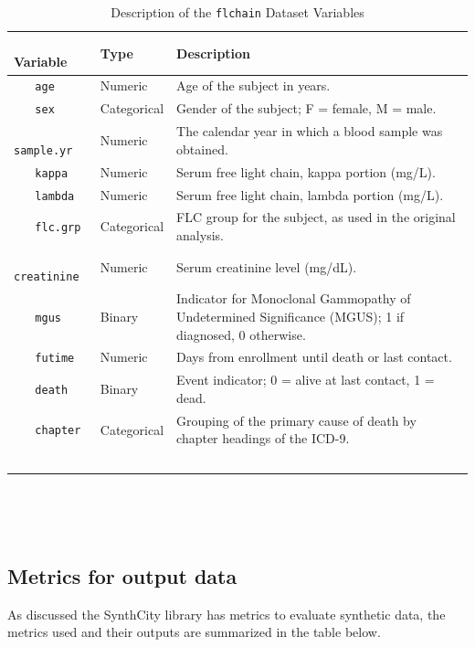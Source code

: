 \begin{table}[H]
    \centering
    \caption{Description of the \texttt{flchain} Dataset Variables}
    \begin{tabular}{|l|l|p{9cm}|}
\hline
    \textbf{Variable} & \textbf{Type} & \textbf{Description} \\ \hline
    \texttt{age} & Numeric & Age of the subject in years. \\ \hline
    \texttt{sex} & Categorical & Gender of the subject; F = female, M = male. \\ \hline
    \texttt{sample.yr} & Numeric & The calendar year in which a blood sample was obtained. \\ \hline
    \texttt{kappa} & Numeric & Serum free light chain, kappa portion (mg/L). \\ \hline
    \texttt{lambda} & Numeric & Serum free light chain, lambda portion (mg/L). \\ \hline
    \texttt{flc.grp} & Categorical & FLC group for the subject, as used in the original analysis. \\ \hline
    \texttt{creatinine} & Numeric & Serum creatinine level (mg/dL). \\ \hline
    \texttt{mgus} & Binary & Indicator for Monoclonal Gammopathy of Undetermined Significance (MGUS); 1 if diagnosed, 0 otherwise. \\ \hline
    \texttt{futime} & Numeric & Days from enrollment until death or last contact. \\ \hline
    \texttt{death} & Binary & Event indicator; 0 = alive at last contact, 1 = dead. \\ \hline
    \texttt{chapter} & Categorical & Grouping of the primary cause of death by chapter headings of the ICD-9. \\ \hline
    \end{tabular}
    \label{tab:flchain_variables}
\end{table}  


\subsection{Metrics for output data}
As discussed the SynthCity \parencite{qian_synthcity_2023} library has metrics to evaluate synthetic data, the metrics used and their outputs are summarized in the table below. 

